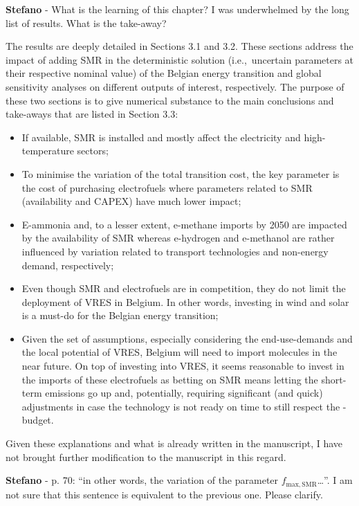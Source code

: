 \documentclass[12pt,a4paper]{article}
\def\ie{i.e.,\ }
\begin{document}
\begin{mdframed}[style=comment] %
{\color{orange} \textbf{Stefano}} - What is the learning of this chapter? I was underwhelmed by the long list of results. What is the take-away?
\end{mdframed}

\noindent The results are deeply detailed in Sections 3.1 and 3.2. These sections address the impact of adding SMR in the deterministic solution (\ie uncertain parameters at their respective nominal value) of the Belgian energy transition and global sensitivity analyses on different outputs of interest, respectively.  The purpose of these two sections is to give numerical substance to the main conclusions and take-aways that are listed in Section 3.3:
\begin{itemize}
\item If available, SMR is installed and mostly affect the electricity and high-temperature sectors;
\item To minimise the variation of the total transition cost, the key parameter is the cost of purchasing electrofuels where parameters related to SMR (availability and CAPEX) have much lower impact;
\item E-ammonia and, to a lesser extent, e-methane imports by 2050 are impacted by the availability of SMR whereas e-hydrogen and e-methanol are rather influenced by variation related to transport technologies and non-energy demand, respectively;
\item Even though SMR and electrofuels are in competition, they do not limit the deployment of VRES in Belgium. In other words, investing in wind and solar is a must-do for the Belgian energy transition;
\item Given the set of assumptions, especially considering the end-use-demands and the local potential of VRES, Belgium will need to import molecules in the near future. On top of investing into VRES, it seems reasonable to invest in the imports of these electrofuels as betting on SMR means letting the short-term emissions go up and, potentially, requiring significant (and quick) adjustments in case the technology is not ready on time to still respect the -budget.
\end{itemize}

Given these explanations and what is already written in the manuscript, I have not brought further modification to the manuscript in this regard.

\begin{mdframed}[style=comment] %
{\color{orange} \textbf{Stefano}} - p. 70: ``in other words, the variation of the parameter $f_{\mathrm{max,SMR}}$…''. I am not sure that this sentence is equivalent to the previous one. Please clarify.
\end{mdframed}
\end{document}
